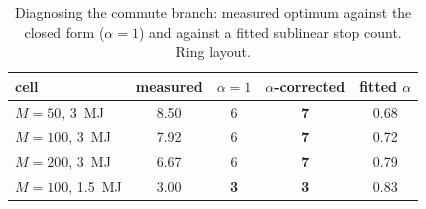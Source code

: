 \documentclass[journal,outdir=./]{IEEEtran}
\begin{document}
\begin{table}[t]\centering
\caption{Diagnosing the commute branch: measured optimum against the closed form ($\alpha=1$) and against a fitted sublinear stop count. Ring layout.}
\label{tab:alpha}
\small
\begin{tabular}{lcccc}
\toprule
cell & measured & $\alpha=1$ & $\alpha$-corrected & fitted $\alpha$\\
\midrule
$M{=}50$, 3~MJ & 8.50 & 6 & \textbf{7} & 0.68\\
$M{=}100$, 3~MJ & 7.92 & 6 & \textbf{7} & 0.72\\
$M{=}200$, 3~MJ & 6.67 & 6 & \textbf{7} & 0.79\\
$M{=}100$, 1.5~MJ & 3.00 & \textbf{3} & \textbf{3} & 0.83\\
\bottomrule
\end{tabular}
\end{table}
\end{document}
